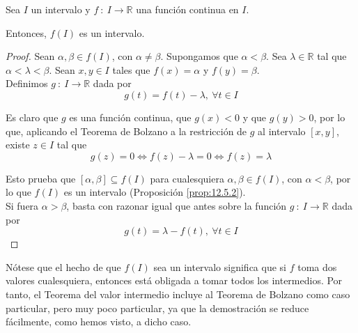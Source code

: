 \begin{teo}
    Sea $I$ un intervalo y $f ~:~ I \longrightarrow \mathbb{R}$ una función continua en $I$.
    
    Entonces, $f(I)$ es un intervalo.
\end{teo}
\begin{proof}
    Sean $\alpha, \beta \in f(I)$, con $\alpha \neq \beta$. Supongamos que $\alpha < \beta$.
    Sea $\lambda \in \mathbb{R}$ tal que $\alpha < \lambda <\beta$. Sean $x,y \in I$ tales que
    $f(x) = \alpha$ y $f(y) = \beta$.\\
    
    Definimos $g ~:~ I \longrightarrow \mathbb{R}$ dada por
    \begin{equation*}
        g(t) = f(t) - \lambda, ~ \forall t \in I
    \end{equation*}
    
    Es claro que $g$ es una función continua, que $g(x) < 0$ y que $g(y) > 0$, por lo que,
    aplicando el Teorema de Bolzano a la restricción de $g$ al intervalo $[x,y]$, existe $z \in I$ tal que
    \begin{equation*}
        g(z) = 0 \Longleftrightarrow f(z) - \lambda = 0 \Longleftrightarrow f(z) = \lambda
    \end{equation*}
    
    Esto prueba que $[\alpha, \beta] \subseteq f(I)$ para cualesquiera $\alpha, \beta \in f(I)$, con $\alpha < \beta$,
    por lo que $f(I)$ es un intervalo (Proposición \ref{prop:12.5.2}).\\
    
    Si fuera $\alpha > \beta$, basta con razonar igual que antes sobre la función
    $g ~:~ I \longrightarrow \mathbb{R}$ dada por
    \begin{equation*}
        g(t) = \lambda - f(t), ~ \forall t \in I
    \end{equation*}
\end{proof}

Nótese que el hecho de que $f(I)$ sea un intervalo significa que si $f$ toma dos valores cualesquiera, entonces está obligada a tomar todos los intermedios. Por tanto, el Teorema del valor intermedio incluye al Teorema de Bolzano como caso particular, pero muy poco particular, ya que la demostración se reduce fácilmente, como hemos visto, a dicho caso.

